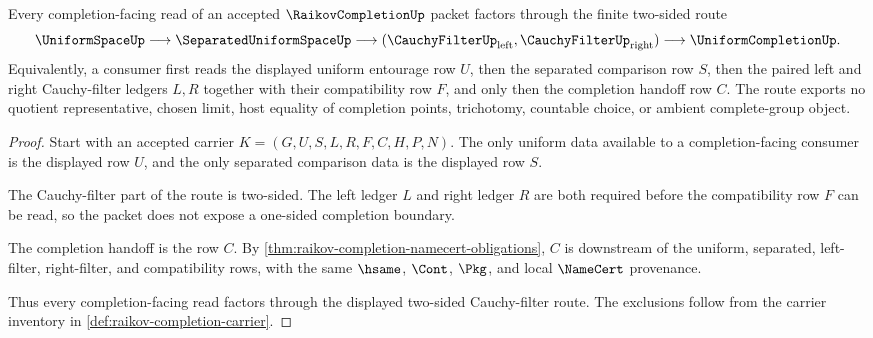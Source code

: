 \begin{theorem}
\label{thm:raikov-completion-two-sided-cauchy-filter-route}
Every completion-facing read of an accepted $\RaikovCompletionUp$ packet factors through the finite two-sided route
$$
\UniformSpaceUp \longrightarrow \SeparatedUniformSpaceUp \longrightarrow
(\CauchyFilterUp_{\mathrm{left}},\CauchyFilterUp_{\mathrm{right}})
\longrightarrow \UniformCompletionUp .
$$
Equivalently, a consumer first reads the displayed uniform entourage row $U$, then the separated comparison row $S$, then the paired left and right Cauchy-filter ledgers $L,R$ together with their compatibility row $F$, and only then the completion handoff row $C$. The route exports no quotient representative, chosen limit, host equality of completion points, trichotomy, countable choice, or ambient complete-group object.
\end{theorem}
\begin{proof}
Start with an accepted carrier $K=(G,U,S,L,R,F,C,H,P,N)$. The only uniform data available to a completion-facing consumer is the displayed row $U$, and the only separated comparison data is the displayed row $S$.

The Cauchy-filter part of the route is two-sided. The left ledger $L$ and right ledger $R$ are both required before the compatibility row $F$ can be read, so the packet does not expose a one-sided completion boundary.

The completion handoff is the row $C$. By \autoref{thm:raikov-completion-namecert-obligations}, $C$ is downstream of the uniform, separated, left-filter, right-filter, and compatibility rows, with the same $\hsame$, $\Cont$, $\Pkg$, and local $\NameCert$ provenance.

Thus every completion-facing read factors through the displayed two-sided Cauchy-filter route. The exclusions follow from the carrier inventory in \autoref{def:raikov-completion-carrier}.
\end{proof}


